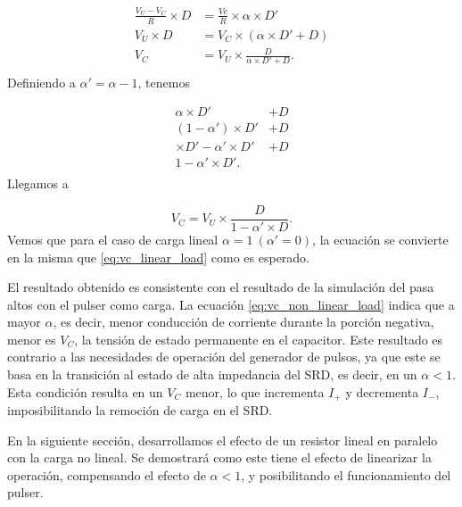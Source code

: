 \begin{equation}
    \label{eq:vc_non_linear_load_0}
    \begin{aligned}
        \frac{V_U-V_C}{R} \times D &= \frac{Vc}{R} \times \alpha \times D' \\
        V_U \times D &= V_C \times \left( \alpha \times D'+D \right) \\
        V_C &= V_U \times \frac{D}{\alpha \times D' + D}.  \\
    \end{aligned}
\end{equation}
Definiendo a $\alpha'=\alpha-1$, tenemos

\begin{equation}
    \label{eq:vc_non_linear_load}
    \begin{aligned}
        \alpha \times D' &+ D \\
        (1-\alpha') \times D' &+ D \\
        \times D' - \alpha' \times D' &+ D \\
        1 - \alpha' \times D'. & \\
    \end{aligned}
\end{equation}
Llegamos a

\begin{equation}
    \label{eq:vc_non_linear_load_final}
        V_C = V_U \times \frac{D}{1-\alpha' \times D}.
\end{equation}
Vemos que para el caso de carga lineal $\alpha = 1 \ (\alpha'=0)$, la ecuación
se convierte en la misma que \ref{eq:vc_linear_load} como es esperado.

El resultado obtenido es consistente con el resultado de la simulación del pasa
altos con el pulser como carga. La ecuación
\ref{eq:vc_non_linear_load}  indica que a mayor $\alpha$, es decir, menor
conducción de corriente durante la porción negativa, menor es $V_C$, la tensión de
estado permanente en el capacitor. Este resultado es contrario a las necesidades
de operación del generador de pulsos, ya que este se basa en la transición al
estado de alta impedancia del SRD, es decir, en un $\alpha < 1$. Esta condición
resulta en un $V_C$ menor, lo que incrementa $I_+$ y decrementa $I_-$,
imposibilitando la remoción de carga en el SRD.

En la siguiente sección, desarrollamos el efecto de un resistor lineal en
paralelo con la carga no lineal. Se demostrará como este tiene el efecto de
linearizar la operación, compensando el efecto de $\alpha < 1$, y posibilitando
el funcionamiento del pulser.

